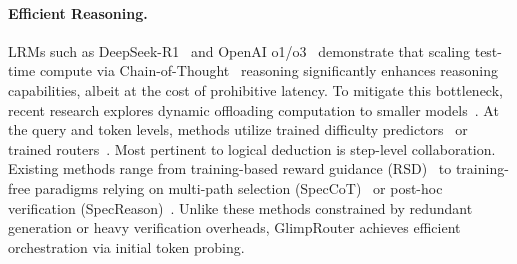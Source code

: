 \documentclass[11pt]{article}
\newcommand{\approach}{{GlimpRouter}\xspace}
\begin{document}
\paragraph{Efficient Reasoning.}
LRMs such as DeepSeek-R1~\cite{guo2025deepseek} and OpenAI o1/o3~\cite{jaech2024openai,openai2025o3} demonstrate that scaling test-time compute via Chain-of-Thought~\cite{wei2022chain} reasoning significantly enhances reasoning capabilities, albeit at the cost of prohibitive latency.
To mitigate this bottleneck, recent research explores dynamic offloading computation to smaller models~\cite{chen2025survey, wang2025mixllm,qu2025survey}.
At the query and token levels, methods utilize trained difficulty predictors~\cite{damani2024learning} or trained routers~\cite{fu2025r2r}.  %
Most pertinent to logical deduction is step-level collaboration. Existing methods range from training-based reward guidance (RSD)~\cite{liaoreward} to training-free paradigms relying on multi-path selection (SpecCoT)~\cite{shi2025speccot} or post-hoc verification (SpecReason)~\cite{pan2025specreason}.
Unlike these methods constrained by redundant generation or heavy verification overheads, \approach achieves efficient orchestration via initial token probing.
\end{document}
